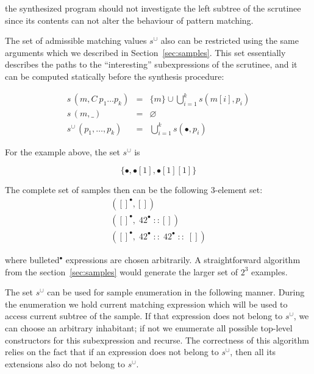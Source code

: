 the synthesized program should not investigate the left subtree of the scrutinee since its contents can not alter the behaviour of pattern matching.

The set of admissible matching values $s^\cup$ also can be restricted using the same arguments which we described in Section~\ref{sec:samples}.
This set essentially describes the paths to the ``interesting'' subexpressions of the scrutinee, and it can be computed statically before
the synthesis procedure:

\[
\begin{array}{rcl}
   s\,(m, C\ p_1 \dots p_k)     & = & \{m\}\cup \bigcup\limits_{i=1}^{k} s(m[i], p_i)\\
   s\,(m,\_)                 & = & \varnothing \\
   s^\cup\,(p_1,\dots, p_k) & = & \bigcup\limits_{i=1}^{k} s(\bullet, p_i)
\end{array}
\]

For the example above, the set  $s^\cup$ is

\[
\{\bullet, \bullet[1], \bullet[1][1]\}
\]

The complete set of samples then can be the following 3-element set:
\begin{align*}
  ([]^\bullet, []) \\
  ([]^\bullet, \; 42^\bullet\; :: []) \\
  ([]^\bullet, \;42^\bullet\; :: \;42^\bullet\; :: \;[])
\end{align*}

%
\noindent where bulleted$^\bullet$ expressions are chosen arbitrarily. A straightforward algorithm from the section~\ref{sec:samples} would generate the larger set of $2^3$ examples.

The set $s^\cup$ can be used for sample enumeration in the following manner. During the enumeration we hold current matching expression which will be used to
access current subtree of the sample. If that expression does not belong to $s^\cup$, we can choose an arbitrary inhabitant; if not we enumerate all
possible top-level constructors for this subexpression and recurse. The correctness of this algorithm relies on the fact that if an expression does
not belong to $s^\cup$, then all its extensions also do not belong to $s^\cup$.


